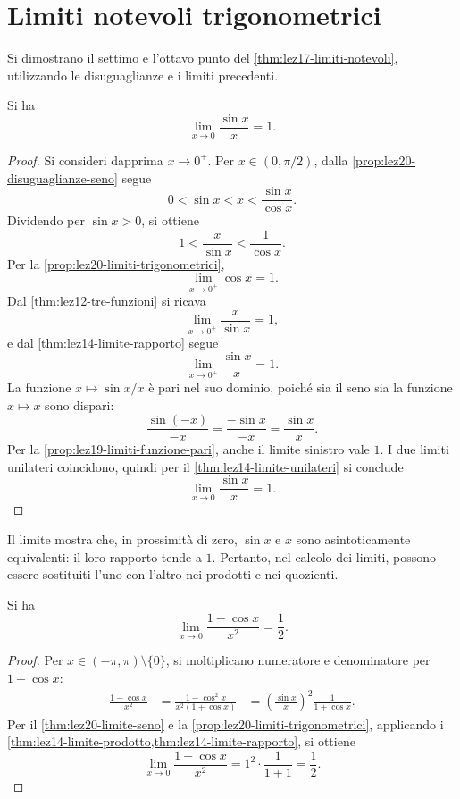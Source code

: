 \section{Limiti notevoli trigonometrici}
\label{sec:lez20-limiti-notevoli-trigonometrici}

Si dimostrano il settimo e l'ottavo punto del
\cref{thm:lez17-limiti-notevoli}, utilizzando
le disuguaglianze e i limiti precedenti.

\begin{theorem}
\label{thm:lez20-limite-seno}
Si ha
\[
  \lim_{x\to0}\frac{\sin x}{x}=1.
\]
\end{theorem}

\begin{proof}
Si consideri dapprima \(x\to0^+\).
Per \(x\in(0,\pi/2)\), dalla
\cref{prop:lez20-disuguaglianze-seno} segue
\[
  0<\sin x<x<\frac{\sin x}{\cos x}.
\]
Dividendo per \(\sin x>0\), si ottiene
\[
  1<\frac{x}{\sin x}<\frac1{\cos x}.
\]
Per la \cref{prop:lez20-limiti-trigonometrici},
\[
  \lim_{x\to0^+}\cos x=1.
\]
Dal \cref{thm:lez12-tre-funzioni} si ricava
\[
  \lim_{x\to0^+}\frac{x}{\sin x}=1,
\]
e dal \cref{thm:lez14-limite-rapporto} segue
\[
  \lim_{x\to0^+}\frac{\sin x}{x}=1.
\]
La funzione \(x\mapsto\sin x/x\) è pari nel
suo dominio, poiché sia il seno sia la funzione
\(x\mapsto x\) sono dispari:
\[
  \frac{\sin(-x)}{-x}
  =\frac{-\sin x}{-x}
  =\frac{\sin x}{x}.
\]
Per la \cref{prop:lez19-limiti-funzione-pari},
anche il limite sinistro vale \(1\). I due limiti
unilateri coincidono, quindi per il
\cref{thm:lez14-limite-unilateri} si conclude
\[
  \lim_{x\to0}\frac{\sin x}{x}=1.
\]
\end{proof}

Il limite mostra che, in prossimità di zero,
\(\sin x\) e \(x\) sono asintoticamente equivalenti:
il loro rapporto tende a \(1\). Pertanto, nel
calcolo dei limiti, possono essere sostituiti
l'uno con l'altro nei prodotti e nei quozienti.

\begin{proposition}
\label{prop:lez20-limite-coseno}
Si ha
\[
  \lim_{x\to0}\frac{1-\cos x}{x^2}=\frac12.
\]
\end{proposition}

\begin{proof}
Per \(x\in(-\pi,\pi)\setminus\{0\}\),
si moltiplicano numeratore e denominatore
per \(1+\cos x\):
\[
\begin{aligned}
  \frac{1-\cos x}{x^2}
  &=\frac{1-\cos^2 x}{x^2(1+\cos x)}
  &=\left(\frac{\sin x}{x}\right)^2
    \frac1{1+\cos x}.
\end{aligned}
\]
Per il \cref{thm:lez20-limite-seno}
e la \cref{prop:lez20-limiti-trigonometrici},
applicando i \cref{thm:lez14-limite-prodotto,thm:lez14-limite-rapporto},
si ottiene
\[
  \lim_{x\to0}\frac{1-\cos x}{x^2}
  =1^2\cdot\frac1{1+1}=\frac12.
\]
\end{proof}

